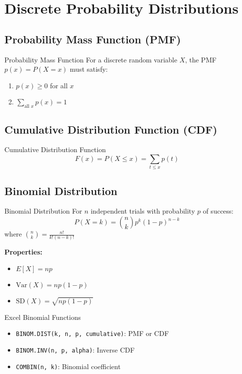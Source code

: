 \documentclass[12pt,a4paper]{book}
\begin{document}
\section{Discrete Probability Distributions}

\subsection{Probability Mass Function (PMF)}

\begin{definition}{Probability Mass Function}
For a discrete random variable $X$, the PMF $p(x) = P(X = x)$ must satisfy:
\begin{enumerate}
    \item $p(x) \geq 0$ for all $x$
    \item $\sum_{\text{all } x} p(x) = 1$
\end{enumerate}
\end{definition}

\subsection{Cumulative Distribution Function (CDF)}

\begin{definition}{Cumulative Distribution Function}
\[
F(x) = P(X \leq x) = \sum_{t \leq x} p(t)
\]
\end{definition}

\subsection{Binomial Distribution}

\begin{definition}{Binomial Distribution}
For $n$ independent trials with probability $p$ of success:
\[
P(X = k) = \binom{n}{k} p^k (1-p)^{n-k}
\]
where $\binom{n}{k} = \frac{n!}{k!(n-k)!}$
\end{definition}

\textbf{Properties:}
\begin{itemize}
    \item $E[X] = np$
    \item $\text{Var}(X) = np(1-p)$
    \item $\text{SD}(X) = \sqrt{np(1-p)}$
\end{itemize}

\begin{example}{Excel Binomial Functions}
\begin{itemize}
    \item \texttt{BINOM.DIST(k, n, p, cumulative)}: PMF or CDF
    \item \texttt{BINOM.INV(n, p, alpha)}: Inverse CDF
    \item \texttt{COMBIN(n, k)}: Binomial coefficient
\end{itemize}
\end{example}
\end{document}
